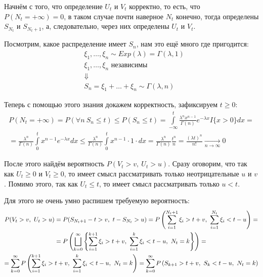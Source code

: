 \begin{solution}
    Начнём с того, что определение $U_t$ и $V_t$ корректно, то есть, что $P(N_t = +\infty) = 0$, в таком случае почти наверное $N_t$ конечно, тогда определены $S_{N_t}$ и $S_{N_t+1}$, а, следовательно, через них определены $U_t$ и $V_t$.

    Посмотрим, какое распределение имеет $S_n$, нам это ещё много где пригодится:
    \begin{align*}
        & \xi_1, \dots, \xi_n \sim Exp(\lambda) = \Gamma(\lambda, 1)
        \\
        & \xi_1, \dots, \xi_n \text{ независимы}
        \\
        & \Downarrow
        \\
        & S_n = \xi_1 + \dots + \xi_n \sim \Gamma(\lambda, n)
    \end{align*}

    Теперь с помощью этого знания докажем корректность, зафиксируем $t \ge 0$:
    \begin{multline*}
        P(N_t = +\infty) = P(\forall n \ S_n \le t) \le P(S_n \le t) = \int\limits_{-\infty}^t \frac{\lambda^n x^{n-1}}{\Gamma(n)} e^{-\lambda x} I\{x > 0\} dx =
        \\
        = \frac{\lambda^n}{\Gamma(n)} \int\limits_0^t x^{n-1} e^{-\lambda x} dx \le \frac{\lambda^n}{\Gamma(n)} \int\limits_0^t x^{n-1} \cdot 1 \cdot dx = \frac{\lambda^n}{\Gamma(n)} \frac{t^n}{n} = \frac{(\lambda t)^n}{n!} \xrightarrow[n \to \infty]{} 0
    \end{multline*}
    
    После этого найдём вероятность $P(V_t > v,\ U_t > u)$. Сразу оговорим, что так как $U_t \ge 0$ и $V_t \ge 0$, то имеет смысл рассматривать только неотрицательные $u$ и $v$. Помимо этого, так как $U_t \le t$, то имеет смысл рассматривать только $u < t$.
    
    Для этого не очень умно распишем требуемую вероятность:
    \begin{multline*}
        P(V_t > v,\ U_t > u) = P(S_{N_t+1} - t > v,\ t - S_{N_t} > u) = P\ps{\sum_{i=1}^{N_t+1} \xi_i > t + v,\ \sum_{i=1}^{N_t} \xi_i < t - u} =
        \\
        = P\ps{\bigsqcup_{k=0}^\infty \set{\sum_{i=1}^{k+1} \xi_i > t + v,\ \sum_{i=1}^{k} \xi_i < t - u,\ N_t = k}} =
        \\
        = \sum_{k=0}^{\infty} P\ps{\sum_{i=1}^{k+1} \xi_i > t + v,\ \sum_{i=1}^{k} \xi_i < t - u,\ N_t = k} = \sum_{k=0}^{\infty} P\ps{S_{k+1} > t + v,\ S_k < t - u,\ N_t = k}
    \end{multline*}


\end{solution}

